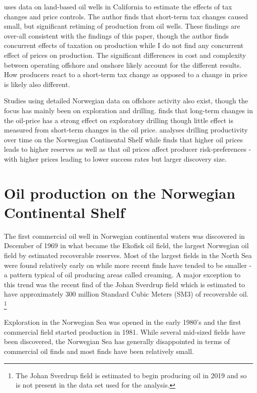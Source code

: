 \documentclass[11pt]{article}
\begin{document}
\citet{rao_taxation_2010} uses data on land-based oil wells in California to estimate the effects of tax changes and price controls.  The author finds that short-term tax changes caused small, but significant retiming of production from oil wells.  These findings are over-all consistent with the findings of this paper, though the author finds concurrent effects of taxation on production while I do not find any concurrent effect of prices on production. The significant differences in cost and complexity between operating offshore and onshore likely account for the different results.  How producers react to a short-term tax change as opposed to a change in price is likely also different.

Studies using detailed Norwegian data on offshore activity also exist, though the focus has mainly been on exploration and drilling.  \citet{mohn_exploration_2008} finds that long-term changes in the oil-price has a strong effect on exploratory drilling though little effect is measured from short-term changes in the oil price.  \citet{osmundsen_exploration_2010} analyses drilling productivity over time on the Norwegian Continental Shelf while \citet{mohn_efforts_2008} finds that higher oil prices leads to higher reserves as well as that oil prices affect producer risk-preferences - with higher prices leading to lower success rates but larger discovery size.  


\section{Oil production on the Norwegian Continental Shelf}

The first commercial oil well in Norwegian continental waters was discovered in December of 1969 in what became the Ekofisk oil field, the largest Norwegian oil field by estimated recoverable reserves.  Most of the largest fields in the North Sea were found relatively early on while more recent finds have tended to be smaller - a pattern typical of oil producing areas called creaming.  A major exception to this trend was the recent find of the Johan Sverdrup field which is estimated to have approximately 300 million Standard Cubic Meters (SM3) of recoverable oil. \footnote{The Johan Sverdrup field is estimated to begin producing oil in 2019 and so is not present in the data set used for the analysis.}  

Exploration in the Norwegian Sea was opened in the early 1980’s and the first commercial field started production in 1981.  While several mid-sized fields have been discovered, the Norwegian Sea has generally disappointed in terms of commercial oil finds and most finds have been relatively small.  
\end{document}
